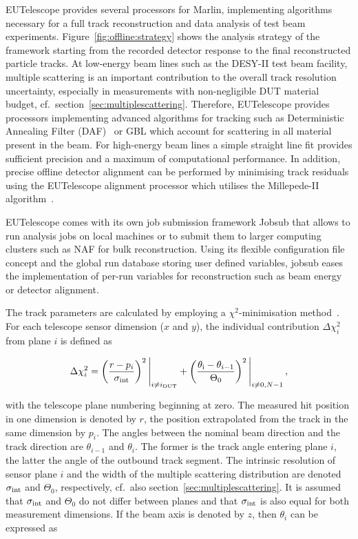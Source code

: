 EUTelescope provides several processors for Marlin, implementing algorithms necessary for a full track reconstruction and data analysis of test beam experiments. 
Figure~\ref{fig:offline:strategy} shows the analysis strategy of the framework starting from the recorded detector response to the final reconstructed particle tracks. 
At low-energy beam lines such as the DESY-II test beam facility, multiple scattering is an important contribution to the overall track resolution uncertainty,
 especially in measurements with non-negligible DUT material budget, cf.\ section~\ref{sec:multiplescattering}.
Therefore, EUTelescope provides processors implementing advanced algorithms for tracking such as Deterministic Annealing Filter (DAF)~\cite{ref:daffitter}
 or GBL which account for scattering in all material present in the beam.
For high-energy beam lines a simple straight line fit provides sufficient precision and a maximum of computational performance.
In addition, precise offline detector alignment can be performed by minimising track residuals using the EUTelescope alignment processor which utilises the Millepede-II algorithm~\cite{Blobel-2006}.

EUTelescope comes with its own job submission framework Jobsub that allows to run analysis jobs on local machines or to submit them to larger computing clusters such as NAF for bulk reconstruction.
Using its flexible configuration file concept and the global run database storing user defined variables,
 jobsub eases the implementation of per-run variables for reconstruction such as beam energy or detector alignment.

 
The track parameters are calculated by employing a $\chi^{2}$-minimisation method~\cite{ref:eudetmemo_2007_01,ref:lutzpaper}.
For each telescope sensor dimension ($x$ and $y$), the individual contribution $\Delta \chi^2_{i}$ from plane $i$ is defined as

\begin{equation}
\label{eq:chi2contrib}
\Delta \chi^2_{i} = \left( \frac{r - p_{i}}{\sigma_{\textrm{int}}} \right)^2 \Bigg|_{i \ne i_{\textrm{DUT}}} +
\left( \frac{\theta_{\textrm{i}} - \theta_{i-1}}{\Theta_{0}} \right)^2 \Bigg|_{i \ne 0,N-1} \,,
\end{equation}

\noindent
with the telescope plane numbering beginning at zero.
The measured hit position in one dimension is denoted by $r$, the position extrapolated from the track in the same dimension by $p_{i}$.
The angles between the nominal beam direction and the track direction are $\theta_{i-1}$ and $\theta_{i}$.
The former is the track angle entering plane $i$, the latter the angle of the outbound track segment.
The intrinsic resolution of sensor plane $i$ and the width of the multiple scattering distribution are denoted $\sigma_{\textrm{int}}$ and $\Theta_{0}$, respectively, cf.~also section~\ref{sec:multiplescattering}. 
It is assumed that $\sigma_{\textrm{int}}$ and $\Theta_{0}$ do not differ between planes and that $\sigma_{\textrm{int}}$ is also equal for both measurement dimensions.
If the beam axis is denoted by $z$, then $\theta_i$ can be expressed as

